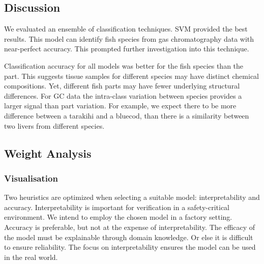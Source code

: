 \documentclass[runningheads]{llncs}
\begin{document}
\subsection{Discussion}
\label{sec:results-classification-discussion}

We evaluated an ensemble of classification techniques.
SVM provided the best results.
This model can identify fish species from gas chromatography data with near-perfect accuracy.
This prompted further investigation into this technique.

Classification accuracy for all models was better for the fish species than the part.
This suggests tissue samples for different species may have distinct chemical compositions.
Yet, different fish parts may have fewer underlying structural differences.
For GC data the intra-class variation between species provides a larger signal than part variation.
For example, we expect there to be more difference between a tarakihi and a bluecod, than there is a similarity between two livers from different species.

\subsection{Weight Analysis}


\subsubsection{Visualisation}
\label{sec:visualisation}


Two heuristics are optimized when selecting a suitable model: interpretability and accuracy. 
Interpretability is important for verification in a safety-critical environment.
We intend to employ the chosen model in a factory setting.
Accuracy is preferable, but not at the expense of interpretability.
The efficacy of the model must be explainable through domain knowledge.
Or else it is difficult to ensure reliability.
The focus on interpretability ensures the model can be used in the real world.
\end{document}
